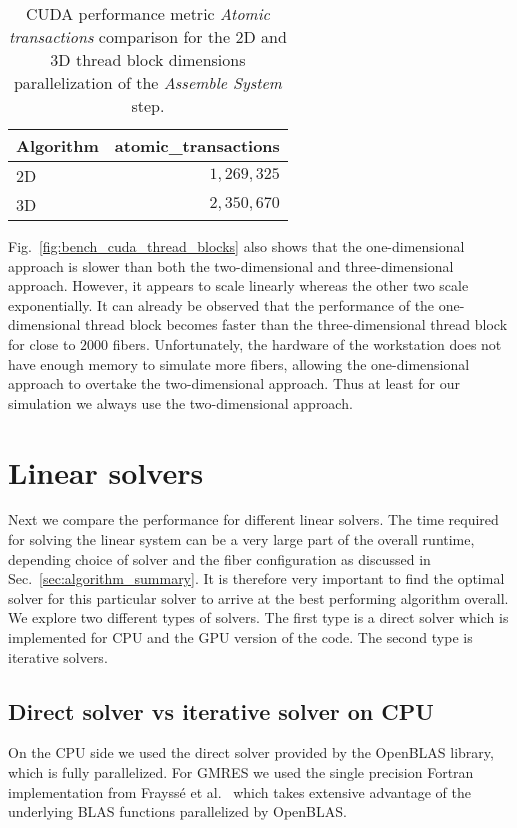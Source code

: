 \begin{table}[!htbp]
  \begin{center}
    \begin{tabulary}{0.7\textwidth}{LR}
      \toprule
      Algorithm & atomic\_transactions \\
      \midrule
      2D & $1,269,325$ \\
      3D & $2,350,670$ \\
      \bottomrule
    \end{tabulary}
  \end{center}
  \caption[Atomic transactions of 2D vs. 3D thread block dimensions.]{CUDA performance metric \emph{Atomic transactions} comparison for the 2D and 3D thread block dimensions parallelization of the \emph{Assemble System} step.}
  \label{tab:atomic_transactions}
\end{table}

Fig.~\ref{fig:bench_cuda_thread_blocks} also shows that the one-dimensional approach is slower than both the two-dimensional and three-dimensional approach. However, it appears to scale linearly whereas the other two scale exponentially. It can already be observed that the performance of the one-dimensional thread block becomes faster than the three-dimensional thread block for close to $2000$ fibers. Unfortunately, the hardware of the workstation does not have enough memory to simulate more fibers, allowing the one-dimensional approach to overtake the two-dimensional approach. Thus at least for our simulation we always use the two-dimensional approach.

\section{Linear solvers}
\label{sec:bench_linear_solvers}

Next we compare the performance for different linear solvers. The time required for solving the linear system can be a very large part of the overall runtime, depending choice of solver and the fiber configuration as discussed in Sec.~\ref{sec:algorithm_summary}. It is therefore very important to find the optimal solver for this particular solver to arrive at the best performing algorithm overall. We explore two different types of solvers. The first type is a direct solver which is implemented for CPU and the GPU version of the code. The second type is iterative solvers. 

\subsection{Direct solver vs iterative solver on CPU}
On the CPU side we used the direct solver provided by the OpenBLAS library, which is fully parallelized. For GMRES we used the single precision Fortran implementation from Frayssé et al.~\cite{Fraysse2003} which takes extensive advantage of the underlying BLAS functions parallelized by OpenBLAS. 


